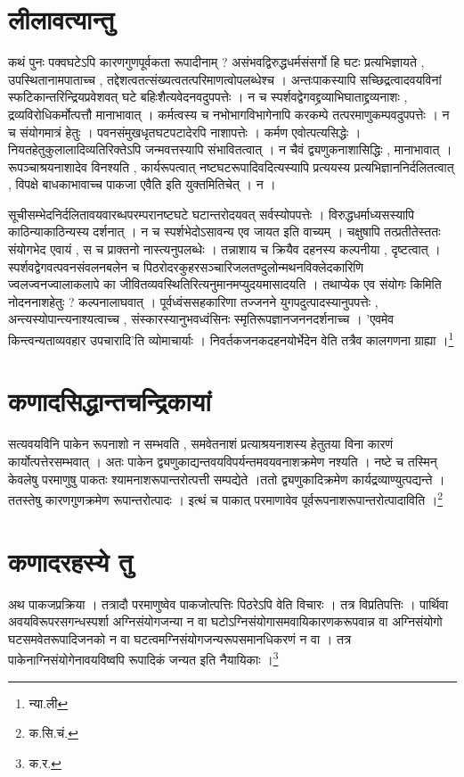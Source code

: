 \section{लीलावत्यान्तु}
कथं पुनः पक्वघटेऽपि कारणगुणपूर्वकता रूपादीनाम् ? असंभवद्विरुद्धधर्मसंसर्गो हि घटः प्रत्यभिज्ञायते , उपस्थितानामपाताच्च , तद्देशत्वतत्संख्यत्वतत्परिमाणत्वोपलब्धेश्च । अन्तःपाकस्यापि सच्छिद्रत्वादवयविनां स्फटिकान्तरिन्द्रियप्रवेशवत् घटे बहिःशैत्यवेदनवदुपपत्तेः । न च स्पर्शवद्वेगवद्द्रव्याभिघाताद्द्रव्यनाशः , द्रव्यविरोधिकर्मोत्पत्तौ मानाभावात् । कर्मत्वस्य च नभोभागविभागेनापि करकम्पे तत्परमाणुकम्पवदुपपत्तेः । न च संयोगमात्रं हेतुः । पवनसंमुखधृतघटपटादेरपि नाशापत्तेः । कर्मण एवोत्पत्यसिद्धेः । नियतहेतुकुलालादिव्यतिरिक्तेऽपि जन्मवत्तस्यापि संभावितत्वात् । न चैवं द्व्यणुकनाशासिद्धिः , मानाभावात् । रूपञ्चाश्रयनाशादेव विनश्यति , कार्यरूपत्वात् नष्टघटरूपादिवदित्यस्यापि प्रत्ययस्य प्रत्यभिज्ञाननिर्दलितत्वात् , विपक्षे बाधकाभावाच्च पाकजा एवैति इति युक्तमितिचेत् । न । 
	
सूचीसम्भेदनिर्दलितावयवारब्धपरम्परानष्टघटे घटान्तरोदयवत् सर्वस्योपपत्तेः । विरुद्धधर्माध्यसस्यापि काठिन्याकाठिन्यस्य दर्शनात् । न च स्पर्शभेदोऽसावन्य एव जायत इति वाच्यम् । चक्षुषापि तत्प्रतीतेस्ततः संयोगभेद एवायं , स च प्राक्तनो नास्त्यनुपलब्धेः । तन्नाशाय च क्रियैव दहनस्य कल्पनीया , दृष्टत्वात् । स्पर्शवद्वेगवत्पवनसंवलनबलेन च पिठरोदरकुहरसञ्चारिजलतण्दुलोन्मथनविक्लेदकारिणि ज्वलज्वनज्वालाकलापे का जीवितव्यवस्थितिरित्यनुमानमप्युदयमासादयति । तथाप्येक एव संयोगः किमिति नोदननाशहेतुः ? कल्पनालाघवात् । पूर्वध्वंससहकारिणा तज्जनने युगपदुत्पादस्यानुपपत्तेः ,  अन्त्यस्योपान्त्यनाश्यत्वाच्च , संस्कारस्यानुभवध्वंसिनः स्मृतिरूपज्ञानजननदर्शनाच्च । ’एवमेव किन्त्वन्यताव्यवहार उपचारादि’ति व्योमाचार्याः । निवर्तकजनकदहनयोर्भेदेन वेति तत्रैव कालगणना ग्राह्या ।\footnote{न्या.ली}


\section{कणादसिद्धान्तचन्द्रिकायां}
सत्यवयविनि पाकेन रूपनाशो न सम्भवति , समवेतनाशं प्रत्याश्रयनाशस्य हेतुतया विना कारणं कार्योत्पत्तेरसम्भवात् । अतः पाकेन द्व्यणुकाद्यन्तवयविपर्यन्तमवयवनाशक्रमेण नश्यति  । नष्टे च तस्मिन् केवलेषु परमाणुषु पाकतः श्यामनाशरूपान्तरोत्पत्ती सम्पद्येते ।ततो द्व्यणुकादिक्रमेण कार्यद्रव्याण्युत्पद्यन्ते । ततस्तेषु कारणगुणक्रमेण रूपान्तरोत्पादः । इत्थं च पाकात् परमाणावेव पूर्वरूपनाशरूपान्तरोत्पादाविति ।\footnote{क.सि.चं.}

\section{कणादरहस्ये तु}
अथ पाकजप्रक्रिया । तत्रादौ परमाणुष्वेव पाकजोत्पत्तिः पिठरेऽपि वेति विचारः । तत्र विप्रतिपत्तिः । पार्थिवा अवयविरूपरसगन्धस्पर्शा अग्निसंयोगजन्या न वा घटोऽग्निसंयोगासमवायिकारणकरूपवान्न वा अग्निसंयोगो घटसमवेतरूपादिजनको न वा घटत्वमग्निसंयोगजन्यरूपसमानधिकरणं न वा । तत्र पाकेनाग्निसंयोगेनावयविष्वपि रूपादिकं जन्यत इति नैयायिकाः ।\footnote{क.र.}




